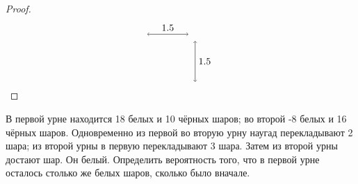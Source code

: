 \begin{proof}
\[\begin{tikzpicture}
			\draw[<->] (0, 1.75) -- (1.5, 1.75) node[midway, above] {1.5};
			\draw[<->] (1.75, 0) -- (1.75, 1.5) node[midway, right] {1.5};
		\end{tikzpicture}
	\]
\end{proof}

\begin{problem}
В первой урне находится 18 белых и 10 чёрных шаров; во второй -8 белых и 16 чёрных шаров. Одновременно из первой во вторую урну наугад перекладывают 2 шара; из второй урны в первую перекладывают 3 шара. Затем из второй урны достают шар. Он белый. Определить вероятность того, что в первой урне осталось столько же белых шаров, сколько было вначале.
\end{problem}

